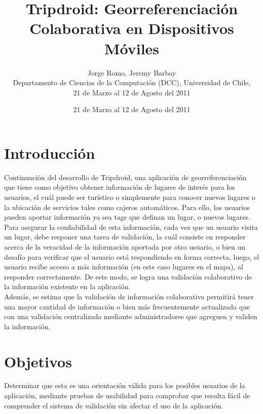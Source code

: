 \documentclass{sig-alternate}
\newcommand{\Title}{Tripdroid: Georreferenciación Colaborativa en Dispositivos Móviles}
\newcommand{\TitleShort}{\Title}
\newcommand{\Authors}{Jorge Romo, Jeremy Barbay}
\newcommand{\AuthorsShort}{J.Romo, J.Barbay}
\begin{document}
\title{\Title}

\author{\Authors \\[1mm]
Departamento de Ciencias de la Computación (DCC), Universidad de Chile, \\[1mm]21 de Marzo al 12 de Agosto del 2011
}

\date{21 de Marzo al 12 de Agosto del 2011}

\maketitle

\section{Introducción}


Continuación del desarrollo de Tripdroid, una aplicación de georreferenciación que tiene como objetivo obtener información de lugares de interés para los usuarios, el cuál puede ser turístico o simplemente para conocer nuevos lugares o la ubicación de servicios tales como cajeros automáticos. Para ello, los usuarios pueden aportar información ya sea tags que definan un lugar, o nuevos lugares. Para asegurar la confiabilidad de esta información, cada vez que un usuario visita un lugar, debe responer una tarea de validación, la cuál consiste en responder acerca de la veracidad de la información aportada por otro usuario, o bien un desafío para verificar que el usuario está respondiendo en forma correcta, luego, el usuario recibe acceso a más información (en este caso lugares en el mapa), al responder correctamente. De este modo, se logra una validación colaborativo de la información existente en la aplicación.\\

Además, se estima que la validación de información colaborativa permitirá tener una mayor cantidad de información o bien más frecuentemente actualizada que con una validación centralizada mediante administradores que agreguen y validen la información.

\section{Objetivos}

Determinar que esta es una orientación válida para los posibles usuarios de la aplicación, mediante pruebas de usabilidad para comprobar que resulta fácil de comprender el sistema de validación sin afectar el uso de la aplicación.
\end{document}
